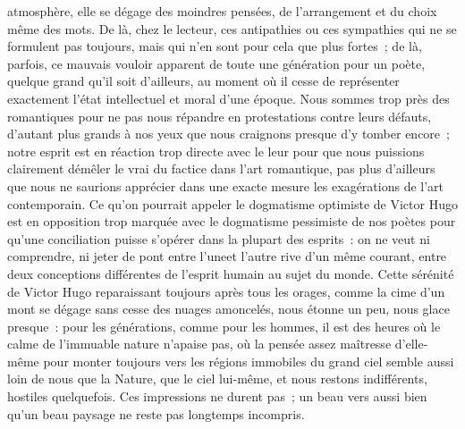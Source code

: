 \documentclass[french,twoside]{book} %
\begin{document}
atmosphère, elle se dégage des moindres pensées, de l’arrangement et du choix même des mots. De là, chez le lecteur, ces antipathies ou ces sympathies qui ne se formulent pas toujours, mais qui n’en sont pour cela que plus fortes ; de là, parfois, ce mauvais vouloir apparent de toute une génération pour un poète, quelque grand qu’il soit d’ailleurs, au moment où il cesse de représenter exactement l’état intellectuel et moral d’une époque. Nous sommes trop près des romantiques pour ne pas nous répandre en protestations contre leurs défauts, d’autant plus grands à nos yeux que nous craignons presque d’y tomber encore ; notre esprit est en réaction trop directe avec le leur pour que nous puissions clairement démêler le vrai du factice dans l’art romantique, pas plus d’ailleurs que nous ne saurions apprécier dans une exacte mesure les exagérations de l’art contemporain. Ce qu’on pourrait appeler le dogmatisme optimiste de Victor Hugo est en opposition trop marquée avec le dogmatisme pessimiste de nos poètes pour qu’une conciliation puisse s’opérer dans la plupart des esprits : on ne veut ni comprendre, ni jeter de pont entre l’uneet l’autre rive d’un même courant, entre deux conceptions différentes de l’esprit humain au sujet du monde. Cette sérénité de Victor Hugo reparaissant toujours après tous les orages, comme la cime d’un mont se dégage sans cesse des nuages amoncelés, nous étonne un peu, nous glace presque : pour les générations, comme pour les hommes, il est des heures où le calme de l’immuable nature n’apaise pas, où la pensée assez maîtresse d’elle-même pour monter toujours vers les régions immobiles du grand ciel semble aussi loin de nous que la Nature, que le ciel lui-même, et nous restons indifférents, hostiles quelquefois. Ces impressions ne durent pas ; un beau vers aussi bien qu’un beau paysage ne reste pas longtemps incompris.
\end{document}
